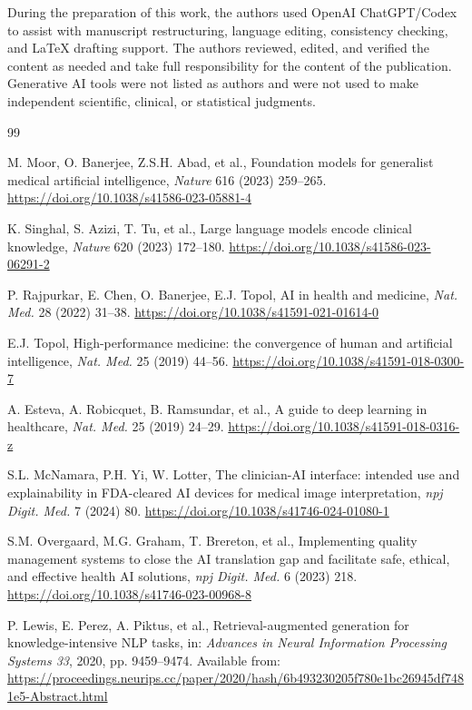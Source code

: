 \documentclass[11pt,a4paper]{article}
\begin{document}
During the preparation of this work, the authors used OpenAI ChatGPT/Codex to assist with manuscript restructuring, language editing, consistency checking, and LaTeX drafting support. The authors reviewed, edited, and verified the content as needed and take full responsibility for the content of the publication. Generative AI tools were not listed as authors and were not used to make independent scientific, clinical, or statistical judgments.

\begin{thebibliography}{99}

M. Moor, O. Banerjee, Z.S.H. Abad, et al., Foundation models for generalist medical artificial intelligence, \emph{Nature} 616 (2023) 259--265. \url{https://doi.org/10.1038/s41586-023-05881-4}

K. Singhal, S. Azizi, T. Tu, et al., Large language models encode clinical knowledge, \emph{Nature} 620 (2023) 172--180. \url{https://doi.org/10.1038/s41586-023-06291-2}

P. Rajpurkar, E. Chen, O. Banerjee, E.J. Topol, AI in health and medicine, \emph{Nat. Med.} 28 (2022) 31--38. \url{https://doi.org/10.1038/s41591-021-01614-0}

E.J. Topol, High-performance medicine: the convergence of human and artificial intelligence, \emph{Nat. Med.} 25 (2019) 44--56. \url{https://doi.org/10.1038/s41591-018-0300-7}

A. Esteva, A. Robicquet, B. Ramsundar, et al., A guide to deep learning in healthcare, \emph{Nat. Med.} 25 (2019) 24--29. \url{https://doi.org/10.1038/s41591-018-0316-z}

S.L. McNamara, P.H. Yi, W. Lotter, The clinician-AI interface: intended use and explainability in FDA-cleared AI devices for medical image interpretation, \emph{npj Digit. Med.} 7 (2024) 80. \url{https://doi.org/10.1038/s41746-024-01080-1}

S.M. Overgaard, M.G. Graham, T. Brereton, et al., Implementing quality management systems to close the AI translation gap and facilitate safe, ethical, and effective health AI solutions, \emph{npj Digit. Med.} 6 (2023) 218. \url{https://doi.org/10.1038/s41746-023-00968-8}

P. Lewis, E. Perez, A. Piktus, et al., Retrieval-augmented generation for knowledge-intensive NLP tasks, in: \emph{Advances in Neural Information Processing Systems 33}, 2020, pp. 9459--9474. Available from: \url{https://proceedings.neurips.cc/paper/2020/hash/6b493230205f780e1bc26945df7481e5-Abstract.html}


\end{thebibliography}
\end{document}
